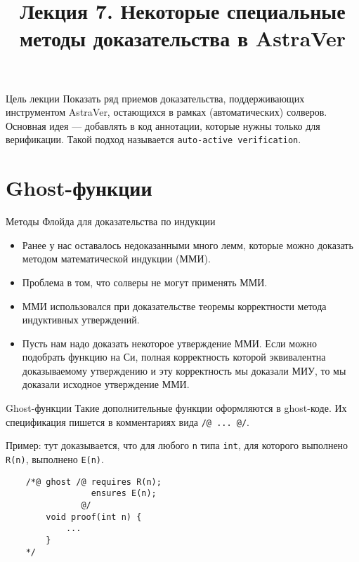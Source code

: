 \documentclass[hyperref={unicode=true}]{beamer}
\title{Лекция 7. Некоторые специальные методы доказательства в AstraVer}
\author{}
\date{}
\begin{document}
	\begin{frame}{}
		\titlepage
	\end{frame}

    \begin{frame}{Цель лекции}
    Показать ряд приемов доказательства, поддерживающих инструментом AstraVer, остающихся
    в рамках (автоматических) солверов. Основная идея --- добавлять в код аннотации, которые
    нужны только для верификации. Такой подход называется \texttt{auto-active verification}.
    \end{frame}

    \section{Ghost-функции}

    \begin{frame}{Методы Флойда для доказательства по индукции}
    \begin{itemize}
    \item Ранее у нас оставалось недоказанными много лемм, которые можно доказать методом
    математической индукции (ММИ).
    \item Проблема в том, что солверы не могут применять ММИ.
    \item ММИ использовался при доказательстве теоремы корректности метода индуктивных утверждений.
    \item Пусть нам надо доказать некоторое утверждение ММИ. Если можно подобрать функцию на Си,
    полная корректность которой эквивалентна доказываемому утверждению и эту корректность мы доказали
    МИУ, то мы доказали исходное утверждение ММИ.
    \end{itemize}
    \end{frame}

    \begin{frame}[fragile]{Ghost-функции}
    Такие дополнительные функции оформляются в ghost-коде. Их спецификация пишется в комментариях
    вида \texttt{/@ ... @/}.

    Пример: тут доказывается, что для любого \texttt{n} типа \texttt{int}, для которого выполнено
    \texttt{R(n)}, выполнено \texttt{E(n)}.

    \begin{verbatim}
    /*@ ghost /@ requires R(n);
                 ensures E(n);
               @/
        void proof(int n) {
            ...
        }
    */
    \end{verbatim}
    \end{frame}
\end{document}
